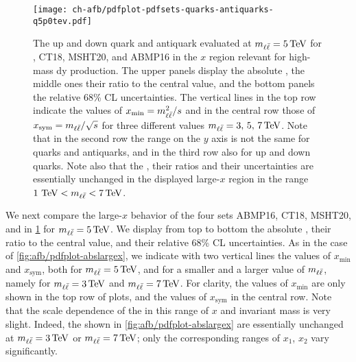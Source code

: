 \begin{figure}[!t]
 \centering
 \texttt{[image: ch-afb/pdfplot-pdfsets-quarks-antiquarks-q5p0tev.pdf]}
 \caption{\small The up and down quark and antiquark \pdfs evaluated at $\mll=\SI{5}{\tera\electronvolt}$
   for , CT18, MSHT20, and ABMP16 in the $x$ region relevant for
   high-mass \acrlong{dy} production. The upper panels display the absolute \pdfs,
   the middle ones their ratio to the central  value, and the bottom panels
   the relative 68\% CL uncertainties.
   The vertical lines in the top
   row indicate the values of  $x_{\text{min}}=m_{\ell\bar{\ell}}^2/s$ and in the central
   row those of $x_{\text{sym}}=m_{\ell\bar{\ell}}/\sqrt{s}$
   for three
   different values  $\mll=3,\,5,\,\SI{7}{\tera\electronvolt}$.
   Note that in the second row the
   range on the $y$ axis is not the same for quarks and antiquarks,
   and in the third row also for up and down quarks.
   Note also that the
   \pdfs, their ratios and their uncertainties are essentially
   unchanged in the displayed large-$x$ region in the range $1~{\text{TeV}}<\mll<\SI{7}{\tera\electronvolt}$.
}    
 \label{fig:afb/mll_dep_pdfs}
\end{figure}

We next compare the large-$x$ behavior 
of the four \pdf sets ABMP16, CT18, MSHT20, and  in \cref{fig:afb/mll_dep_pdfs}
for $\mll=\SI{5}{\tera\electronvolt}$.
%
We display from top to bottom the absolute \pdfs, their ratio to the central  value, and
their relative 68\% CL uncertainties.
%
As in the case of \cref{fig:afb/pdfplot-abslargex}, we indicate with two vertical lines
the values of $x_{\text{min}}$ and $x_{\text{sym}}$,
both for $\mll=\SI{5}{\tera\electronvolt}$, and for a smaller and a larger value of $m_{\ell\bar{\ell}}$,
namely for $\mll=\SI{3}{\tera\electronvolt}$ and  $\mll=\SI{7}{\tera\electronvolt}$.
%
For clarity, the values of $x_{\text{min}}$ are only shown 
in the top row of plots, and the values of  $x_{\text{sym}}$ in the
central row. Note that the scale dependence
of the \pdfs in this range of  $x$ and invariant mass is very
slight. Indeed, the \pdfs shown in \cref{fig:afb/pdfplot-abslargex} are
essentially unchanged at $\mll=\SI{3}{\tera\electronvolt}$ or  $\mll=\SI{7}{\tera\electronvolt}$;  only the
corresponding ranges of $x_1$, $x_2$ vary significantly.

